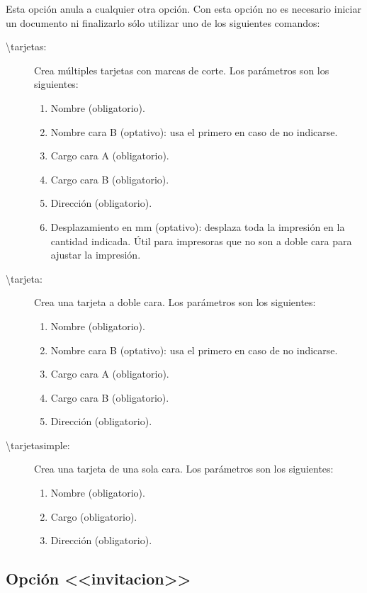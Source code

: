 \documentclass[numerado,carta]{plantillasEPS} %
\begin{document}
Esta opción anula a cualquier otra opción. Con esta opción no es necesario iniciar un documento ni finalizarlo sólo utilizar uno de los siguientes comandos:
\begin{description}
    \item[{\textbackslash}tarjetas:] Crea múltiples tarjetas con marcas de corte. Los parámetros son los siguientes:
    \begin{enumerate}
        \item Nombre (obligatorio).
        \item Nombre cara B (optativo): usa el primero en caso de no indicarse.
        \item Cargo cara A (obligatorio).
        \item Cargo cara B (obligatorio).
        \item Dirección (obligatorio).
        \item Desplazamiento en mm (optativo): desplaza toda la impresión en la cantidad indicada. Útil para impresoras que no son a doble cara para ajustar la impresión.
    \end{enumerate}
    \item[{\textbackslash}tarjeta:] Crea una tarjeta a doble cara. Los parámetros son los siguientes:
    \begin{enumerate}
        \item Nombre (obligatorio).
        \item Nombre cara B (optativo): usa el primero en caso de no indicarse.
        \item Cargo cara A (obligatorio).
        \item Cargo cara B (obligatorio).
        \item Dirección (obligatorio).
    \end{enumerate}
    \item[{\textbackslash}tarjetasimple:] Crea una tarjeta de una sola cara. Los parámetros son los siguientes:
    \begin{enumerate}
        \item Nombre (obligatorio).
        \item Cargo (obligatorio).
        \item Dirección (obligatorio).
    \end{enumerate}
\end{description}

\subsection{Opción <<invitacion>>}
\end{document}
